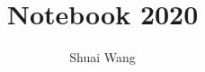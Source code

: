 \documentclass[../main.tex]{subfiles}
\begin{document}
\title[Notebook 2020]{Notebook 2020}
\author{Shuai Wang}
\end{document}

